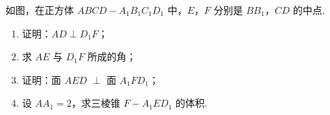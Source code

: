 \begin{problem}
如图，在正方体 \(ABCD - A_{1}B_{1}C_{1}D_{1}\) 中，\(E\)，\(F\) 分别是 \(BB_{1}\)，\(CD\) 的中点.

\begin{enumerate}
\item 证明：\(AD \perp D_{1}F\)；

\item 求 \(AE\) 与 \(D_{1}F\) 所成的角；

\item 证明：面 \(AED\) \(\perp\) 面 \(A_{1}FD_{1}\)；

\item 设 \(AA_{1} = 2\)，求三棱锥 \(F - A_{1}ED_{1}\) 的体积.
\end{enumerate}

\end{problem}

